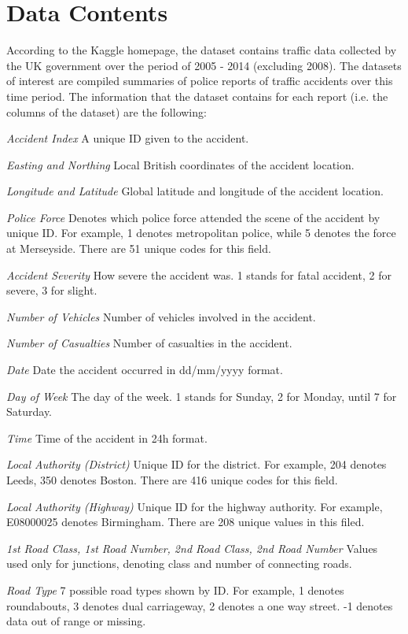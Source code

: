 \documentclass[a4paper, 12pt]{article}
\begin{document}
\section{Data Contents}
According to the Kaggle homepage, the dataset contains traffic data collected by the UK government over the period of 2005 - 2014 (excluding 2008). The datasets of interest are compiled summaries of police reports of traffic accidents over this time period. The information that the dataset contains for each report (i.e. the columns of the dataset) are the following:
\begin{description}
\item{\emph{Accident Index}} A unique ID given to the accident.
\item{\emph{Easting and Northing}} Local British coordinates of the accident location.
\item{\emph{Longitude and Latitude}} Global latitude and longitude of the accident location.
\item{\emph{Police Force}} Denotes which police force attended the scene of the accident by unique ID. For example, 1 denotes metropolitan police, while 5 denotes the force at Merseyside. There are 51 unique codes for this field.
\item{\emph{Accident Severity}} How severe the accident was. 1 stands for fatal accident, 2 for severe, 3 for slight.
\item{\emph{Number of Vehicles}} Number of vehicles involved in the accident.
\item{\emph{Number of Casualties}} Number of casualties in the accident.
\item{\emph{Date}} Date the accident occurred in dd/mm/yyyy format.
\item{\emph{Day of Week}} The day of the week. 1 stands for Sunday, 2 for Monday, until 7 for Saturday.
\item{\emph{Time}} Time of the accident in 24h format.
\item{\emph{Local Authority (District)}} Unique ID for the district. For example, 204 denotes Leeds, 350 denotes Boston. There are 416 unique codes for this field.
\item{\emph{Local Authority (Highway)}} Unique ID for the highway authority. For example, E08000025 denotes Birmingham. There are 208 unique values in this filed.
\item{\emph{1st Road Class, 1st Road Number, 2nd Road Class, 2nd Road Number}} Values used only for junctions, denoting class and number of connecting roads.
\item{\emph{Road Type}} 7 possible road types shown by ID. For example, 1 denotes roundabouts, 3 denotes dual carriageway, 2 denotes a one way street. -1 denotes data out of range or missing.

\end{description}
\end{document}
